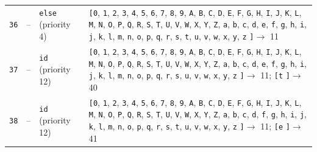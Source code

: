 \documentclass[11pt,a4paper]{article}
\newcommand{\opensymbolset}{\texttt{[}}
\newcommand{\closesymbolset}{\texttt{]}}
\begin{document}
\begin{landscape}
\begin{longtable}{
    >{\centering\arraybackslash}p{0.8cm}
    >{\centering\arraybackslash}p{0.7cm}
    >{\raggedright\arraybackslash}p{3.7cm}
    >{\raggedright\arraybackslash}p{18.1cm}
}
\texttt{36} & -- & \texttt{else} (priority 4) & \opensymbolset \texttt{0}, \texttt{1}, \texttt{2}, \texttt{3}, \texttt{4}, \texttt{5}, \texttt{6}, \texttt{7}, \texttt{8}, \texttt{9}, \texttt{A}, \texttt{B}, \texttt{C}, \texttt{D}, \texttt{E}, \texttt{F}, \texttt{G}, \texttt{H}, \texttt{I}, \texttt{J}, \texttt{K}, \texttt{L}, \texttt{M}, \texttt{N}, \texttt{O}, \texttt{P}, \texttt{Q}, \texttt{R}, \texttt{S}, \texttt{T}, \texttt{U}, \texttt{V}, \texttt{W}, \texttt{X}, \texttt{Y}, \texttt{Z}, \texttt{a}, \texttt{b}, \texttt{c}, \texttt{d}, \texttt{e}, \texttt{f}, \texttt{g}, \texttt{h}, \texttt{i}, \texttt{j}, \texttt{k}, \texttt{l}, \texttt{m}, \texttt{n}, \texttt{o}, \texttt{p}, \texttt{q}, \texttt{r}, \texttt{s}, \texttt{t}, \texttt{u}, \texttt{v}, \texttt{w}, \texttt{x}, \texttt{y}, \texttt{z} \closesymbolset $\to$ 11 \\
\texttt{37} & -- & \texttt{id} (priority 12) & \opensymbolset \texttt{0}, \texttt{1}, \texttt{2}, \texttt{3}, \texttt{4}, \texttt{5}, \texttt{6}, \texttt{7}, \texttt{8}, \texttt{9}, \texttt{A}, \texttt{B}, \texttt{C}, \texttt{D}, \texttt{E}, \texttt{F}, \texttt{G}, \texttt{H}, \texttt{I}, \texttt{J}, \texttt{K}, \texttt{L}, \texttt{M}, \texttt{N}, \texttt{O}, \texttt{P}, \texttt{Q}, \texttt{R}, \texttt{S}, \texttt{T}, \texttt{U}, \texttt{V}, \texttt{W}, \texttt{X}, \texttt{Y}, \texttt{Z}, \texttt{a}, \texttt{b}, \texttt{c}, \texttt{d}, \texttt{e}, \texttt{f}, \texttt{g}, \texttt{h}, \texttt{i}, \texttt{j}, \texttt{k}, \texttt{l}, \texttt{m}, \texttt{n}, \texttt{o}, \texttt{p}, \texttt{q}, \texttt{r}, \texttt{s}, \texttt{u}, \texttt{v}, \texttt{w}, \texttt{x}, \texttt{y}, \texttt{z} \closesymbolset $\to$ 11; \opensymbolset \texttt{t} \closesymbolset $\to$ 40 \\
\texttt{38} & -- & \texttt{id} (priority 12) & \opensymbolset \texttt{0}, \texttt{1}, \texttt{2}, \texttt{3}, \texttt{4}, \texttt{5}, \texttt{6}, \texttt{7}, \texttt{8}, \texttt{9}, \texttt{A}, \texttt{B}, \texttt{C}, \texttt{D}, \texttt{E}, \texttt{F}, \texttt{G}, \texttt{H}, \texttt{I}, \texttt{J}, \texttt{K}, \texttt{L}, \texttt{M}, \texttt{N}, \texttt{O}, \texttt{P}, \texttt{Q}, \texttt{R}, \texttt{S}, \texttt{T}, \texttt{U}, \texttt{V}, \texttt{W}, \texttt{X}, \texttt{Y}, \texttt{Z}, \texttt{a}, \texttt{b}, \texttt{c}, \texttt{d}, \texttt{f}, \texttt{g}, \texttt{h}, \texttt{i}, \texttt{j}, \texttt{k}, \texttt{l}, \texttt{m}, \texttt{n}, \texttt{o}, \texttt{p}, \texttt{q}, \texttt{r}, \texttt{s}, \texttt{t}, \texttt{u}, \texttt{v}, \texttt{w}, \texttt{x}, \texttt{y}, \texttt{z} \closesymbolset $\to$ 11; \opensymbolset \texttt{e} \closesymbolset $\to$ 41 \\

\end{longtable}
\end{landscape}
\end{document}
